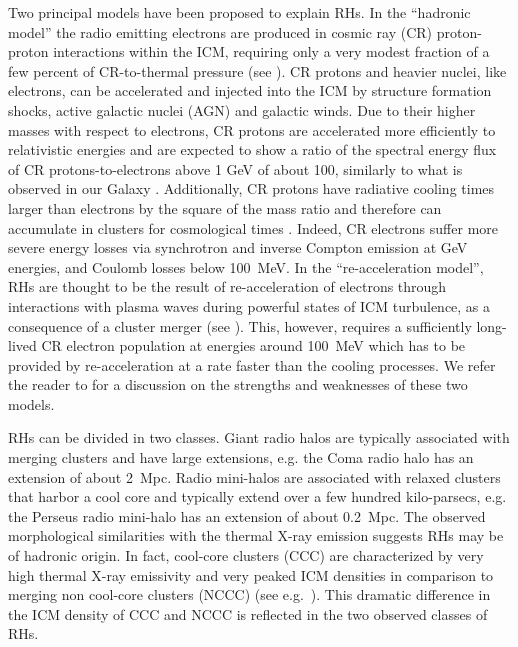 \documentclass[traditabstract]{aa}
\begin{document}
Two principal models have been proposed to explain RHs.  In the ``hadronic
model'' the radio emitting electrons are produced in cosmic ray (CR)
proton-proton interactions within the ICM, requiring only a very modest fraction
of a few percent of CR-to-thermal pressure (see
\citealp{1980ApJ...239L..93D,1982AJ.....87.1266V, 1999APh....12..169B,
  2000A&A...362..151D, 2001ApJ...559...59M, 2001ApJ...562..233M,
  2003A&A...407L..73P, 2004A&A...413...17P, 2004MNRAS.352...76P,
  2007IJMPA..22..681B, 2008MNRAS.385.1211P, 2008MNRAS.385.1242P,
  2009JCAP...09..024K, 2010MNRAS.401...47D, 2010arXiv1003.0336D,
  2010arXiv1003.1133K, 2010arXiv1011.0729K, 2011A&A...527A..99E}).  CR protons
and heavier nuclei, like electrons, can be accelerated and injected into the ICM
by structure formation shocks, active galactic nuclei (AGN) and galactic winds.
Due to their higher masses with respect to electrons, CR protons are accelerated
more efficiently to relativistic energies and are expected to show a ratio of
the spectral energy flux of CR protons-to-electrons above 1 GeV of about 100,
similarly to what is observed in our Galaxy
\citep{2002cra..book.....S}. Additionally, CR protons have radiative cooling
times larger than electrons by the square of the mass ratio and therefore can
accumulate in clusters for cosmological times
\citep{1996SSRv...75..279V}. Indeed, CR electrons suffer more severe energy
losses via synchrotron and inverse Compton emission at GeV energies, and Coulomb
losses below 100~MeV.  In the ``re-acceleration model'', RHs are thought to be
the result of re-acceleration of electrons through interactions with plasma
waves during powerful states of ICM turbulence, as a consequence of a cluster
merger (see \citealp{1987A&A...182...21S, 1993ApJ...406..399G,
  2002A&A...386..456G, 2004MNRAS.350.1174B, 2005MNRAS.363.1173B,
  2007MNRAS.378..245B, 2010arXiv1008.0184B, 2009A&A...507..661B}). This,
however, requires a sufficiently long-lived CR electron population at energies
around 100~MeV which has to be provided by re-acceleration at a rate faster than
the cooling processes.  We refer the reader to \citet{2011A&A...527A..99E} for a
discussion on the strengths and weaknesses of these two models.

RHs can be divided in two classes. Giant radio halos are typically associated
with merging clusters and have large extensions, e.g. the Coma radio halo has an
extension of about 2~Mpc. Radio mini-halos are associated with relaxed clusters
that harbor a cool core and typically extend over a few hundred kilo-parsecs,
e.g. the Perseus radio mini-halo has an extension of about 0.2~Mpc.  The
observed morphological similarities with the thermal X-ray emission suggests RHs
may be of hadronic origin. In fact, cool-core clusters (CCC) are characterized
by very high thermal X-ray emissivity and very peaked ICM densities in
comparison to merging non cool-core clusters (NCCC) (see
e.g.~\citealp{2008A&A...487..431C}). This dramatic difference in the ICM density
of CCC and NCCC is reflected in the two observed classes of RHs.
\end{document}
